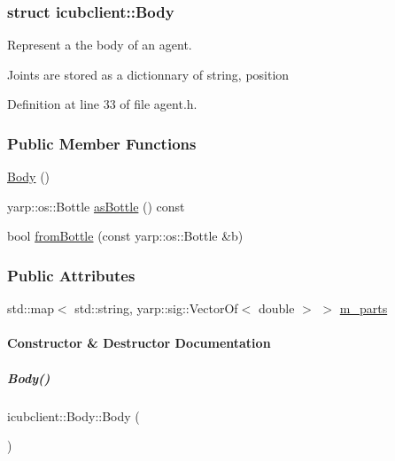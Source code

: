 \subsubsection{struct icubclient\+:\+:Body}
Represent a the body of an agent. 

Joints are stored as a dictionnary of string, position 

Definition at line 33 of file agent.\+h.

\subsubsection*{Public Member Functions}
\begin{DoxyCompactItemize}
\item 
\hyperlink{group__icubclient__representations_a0d2109199526e443d321a69dd23398b2}{Body} ()
\item 
yarp\+::os\+::\+Bottle \hyperlink{group__icubclient__representations_af2ba1e2ba63afa934054d0055bd4a61d}{as\+Bottle} () const
\item 
bool \hyperlink{group__icubclient__representations_a63aee3af01b5e41f75f0a9d6df43a7ea}{from\+Bottle} (const yarp\+::os\+::\+Bottle \&b)
\end{DoxyCompactItemize}
\subsubsection*{Public Attributes}
\begin{DoxyCompactItemize}
\item 
std\+::map$<$ std\+::string, yarp\+::sig\+::\+Vector\+Of$<$ double $>$ $>$ \hyperlink{group__icubclient__representations_ac31e859719f94ca6606132b47bc27421}{m\+\_\+parts}
\end{DoxyCompactItemize}


\paragraph{Constructor \& Destructor Documentation}
\mbox{\label{group__icubclient__representations_a0d2109199526e443d321a69dd23398b2}} 
\subparagraph{\texorpdfstring{Body()}{Body()}}
{\footnotesize\ttfamily icubclient\+::\+Body\+::\+Body (\begin{DoxyParamCaption}{ }\end{DoxyParamCaption})\hspace{0.3cm}{\ttfamily [inline]}}



